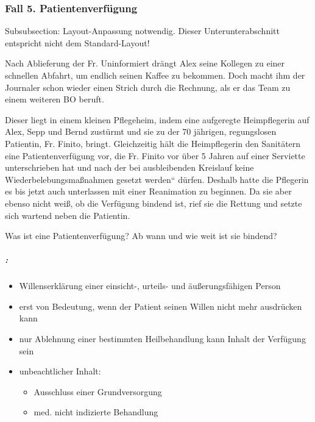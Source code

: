 \subsubsection{Fall 5.
Patientenverf\"ugung}\label{topic:patientenverfuegung}
\begin{anfxwarning}[author=GABS]{Subsubsection: Layout-Anpassung notwendig.}
Dieser Unterunterabschnitt entspricht nicht dem Standard-Layout!
\end{anfxwarning}

Nach Ablieferung der Fr. Uninformiert drängt Alex seine Kollegen zu
einer schnellen Abfahrt, um endlich seinen Kaffee zu bekommen. Doch
macht ihm der Journaler schon wieder einen Strich durch die Rechnung,
als er das Team zu einem weiteren BO beruft.

Dieser liegt in einem kleinen Pflegeheim, indem eine aufgeregte
Heimpflegerin auf Alex, Sepp und Bernd zust\"urmt und sie zu der 70
jährigen, regungslosen Patientin, Fr. Finito, bringt.
Gleichzeitig hält die Heimpflegerin den Sanitätern eine Patientenverf\"ugung vor, die
Fr. Finito vor \"uber 5 Jahren auf einer Serviette unterschrieben hat
und nach der {\quotedblbase}bei ausbleibenden Kreislauf keine
Wiederbelebungsma{\ss}nahmen gesetzt werden{\textquotedblleft}
d\"urfen. Deshalb hatte die Pflegerin es bis jetzt auch unterlassen mit
einer Reanimation zu beginnen. Da sie aber ebenso nicht wei{\ss}, ob
die Verf\"ugung bindend ist, rief sie die Rettung und setzte sich
wartend neben die Patientin.


Was ist eine Patientenverf\"ugung? Ab wann und wie weit ist sie bindend?


\subparagraph*{:}

\begin{itemize}
    \item
    Willenserklärung einer einsicht-, urteils- und
    äu{\ss}erungsfähigen Person
    
    \item {\mdseries
    erst von Bedeutung, wenn der Patient seinen Willen nicht mehr ausdr\"ucken
    kann}
    
    \item {\mdseries
    nur Ablehnung einer bestimmten Heilbehandlung kann Inhalt der Verf\"ugung sein}
    
    \item unbeachtlicher Inhalt:
    
    \begin{itemize}
        \item Ausschluss einer Grundversorgung
        
        \item med. nicht indizierte Behandlung
    \end{itemize}
\end{itemize}

